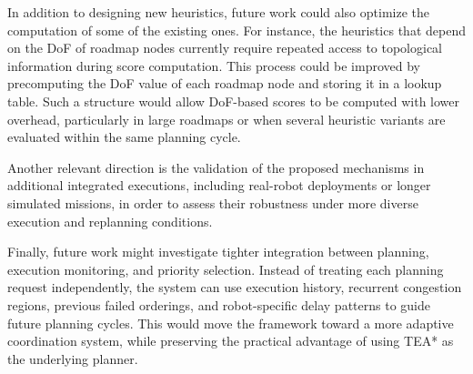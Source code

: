 In addition to designing new heuristics, future work could also optimize the computation of some of the existing ones. For instance, the heuristics that depend on the DoF of roadmap nodes currently require repeated access to topological information during score computation. This process could be improved by precomputing the DoF value of each roadmap node and storing it in a lookup table. Such a structure would allow DoF-based scores to be computed with lower overhead, particularly in large roadmaps or when several heuristic variants are evaluated within the same planning cycle.

Another relevant direction is the validation of the proposed mechanisms in additional integrated executions, including real-robot deployments or longer simulated missions, in order to assess their robustness under more diverse execution and replanning conditions.

Finally, future work might investigate tighter integration between planning, execution monitoring, and priority selection. Instead of treating each planning request independently, the system can use execution history, recurrent congestion regions, previous failed orderings, and robot-specific delay patterns to guide future planning cycles. This would move the framework toward a more adaptive coordination system, while preserving the practical advantage of using TEA* as the underlying planner.